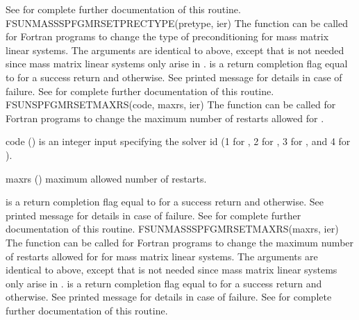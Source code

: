 {
  See  for complete further documentation of
  this routine.
}
{
  FSUNMASSSPFGMRSETPRECTYPE(pretype, ier)
}
{
  The function  can be called for Fortran
  programs to change the type of preconditioning for mass matrix
  linear systems.
}
{
  The arguments are identical to  above, except that
   is not needed since mass matrix linear systems only arise
  in {\arkode}.
}
{
   is a  return completion flag equal to  for a success
  return and  otherwise. See printed message for details in case
  of failure.
}
{
  See  for complete further documentation of
  this routine.
}
{
  FSUNSPFGMRSETMAXRS(code, maxrs, ier)
}
{
  The function  can be called for Fortran programs
  to change the maximum number of restarts allowed for {\spfgmr}.
}
{
  \begin{args}[maxrs]
  \item[code] ()
    is an integer input specifying the solver id (1 for {\cvode}, 2
    for {\ida}, 3 for {\kinsol}, and 4 for {\arkode}).
  \item[maxrs] ()
    maximum allowed number of restarts.
  \end{args}
}
{
   is a  return completion flag equal to  for a success
  return and  otherwise. See printed message for details in case
  of failure.
}
{
  See  for complete further
  documentation of this routine.
}
{
  FSUNMASSSPFGMRSETMAXRS(maxrs, ier)
}
{
  The function  can be called for Fortran
  programs to change the maximum number of restarts allowed for
  {\spfgmr} for mass matrix linear systems.
}
{
  The arguments are identical to  above, except that
   is not needed since mass matrix linear systems only arise
  in {\arkode}.
}
{
   is a  return completion flag equal to  for a success
  return and  otherwise. See printed message for details in case
  of failure.
}
{
  See  for complete further
  documentation of this routine.
}


